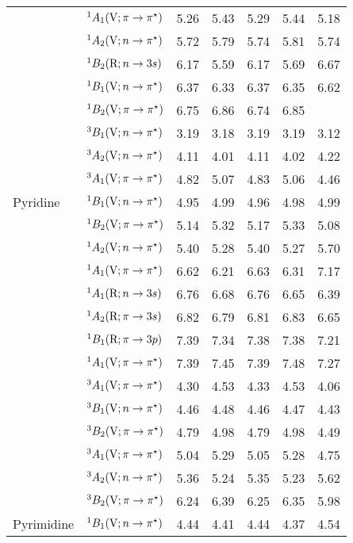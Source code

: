 \begin{tabular}{p{3.5cm}p{3.3cm}c|cccc}
        &$^1A_1 (\mathrm{V}; \pi \rightarrow \pi^\star)$				& 5.26 	&5.43	&5.29	&5.44	&5.18 \\	
        &$^1A_2 (\mathrm{V}; n \rightarrow \pi^\star)$					& 5.72	&5.79	&5.74	&5.81	&5.74 \\	
        &$^1B_2  (\mathrm{R}; n \rightarrow 3s)$				& 6.17	&5.59	&6.17	&5.69	&6.67 \\	
        &$^1B_1 (\mathrm{V}; n \rightarrow \pi^\star)$					& 6.37	&6.33	&6.37	&6.35	&6.62 \\	
        &$^1B_2 (\mathrm{V}; \pi \rightarrow \pi^\star)$				& 6.75	&6.86	&6.74	&6.85	& 	\\
        &$^3B_1 (\mathrm{V}; n \rightarrow \pi^\star)$					& 3.19	&3.18	&3.19	&3.19	&3.12 \\	
        &$^3A_2 (\mathrm{V}; n \rightarrow \pi^\star)$					& 4.11	&4.01	&4.11	&4.02	&4.22 \\	
        &$^3A_1 (\mathrm{V}; \pi \rightarrow \pi^\star)$				& 4.82	&5.07	&4.83	&5.06	&4.46 \\	
  Pyridine		&$^1B_1 (\mathrm{V}; n \rightarrow \pi^\star)$					& 4.95 	&4.99	&4.96	&4.98	&4.99 \\ 	
        &$^1B_2 (\mathrm{V}; \pi \rightarrow \pi^\star)$				& 5.14	&5.32	&5.17	&5.33	&5.08 \\ 	
        &$^1A_2 (\mathrm{V}; n \rightarrow \pi^\star)$					& 5.40	&5.28	&5.40	&5.27	&5.70 \\	
        &$^1A_1 (\mathrm{V}; \pi \rightarrow \pi^\star)$				& 6.62	&6.21	&6.63	&6.31	&7.17 \\	
        &$^1A_1 (\mathrm{R}; n \rightarrow 3s)$					& 6.76	&6.68	&6.76	&6.65	&6.39 \\	
        &$^1A_2 (\mathrm{R}; \pi \rightarrow 3s)$				& 6.82	&6.79	&6.81	&6.83	&6.65 \\	
        &$^1B_1 (\mathrm{R}; \pi \rightarrow 3p)$				& 7.39	&7.34	&7.38	&7.38	&7.21 \\	
        &$^1A_1 (\mathrm{V}; \pi \rightarrow \pi^\star)$				& 7.39	&7.45	&7.39	&7.48	&7.27 \\	
        &$^3A_1 (\mathrm{V}; \pi \rightarrow \pi^\star)$				& 4.30	&4.53	&4.33	&4.53	&4.06 \\	
        &$^3B_1 (\mathrm{V}; n \rightarrow \pi^\star)$					& 4.46	&4.48	&4.46	&4.47	&4.43 \\	
        &$^3B_2 (\mathrm{V}; \pi \rightarrow \pi^\star)$				& 4.79	&4.98	&4.79	&4.98	&4.49 \\	
        &$^3A_1 (\mathrm{V}; \pi \rightarrow \pi^\star)$				& 5.04	&5.29	&5.05	&5.28	&4.75 \\	
        &$^3A_2 (\mathrm{V}; n \rightarrow \pi^\star)$					& 5.36	&5.24	&5.35	&5.23	&5.62 \\	
        &$^3B_2 (\mathrm{V}; \pi \rightarrow \pi^\star)$				& 6.24	&6.39	&6.25	&6.35	&5.98 \\	
  Pyrimidine		&$^1B_1 (\mathrm{V}; n \rightarrow \pi^\star)$					& 4.44	&4.41	&4.44	&4.37	&4.54 \\	

\end{tabular}
